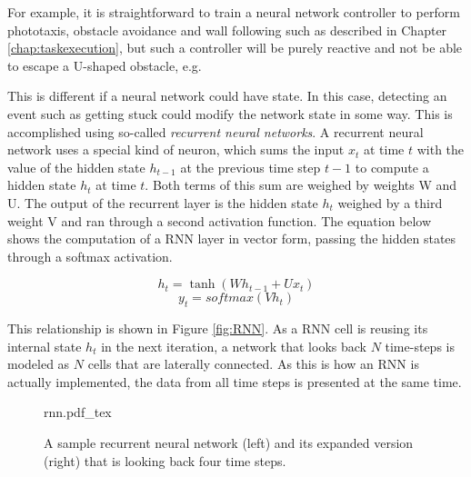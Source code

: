 For example, it is straightforward to train a neural network controller to perform phototaxis, obstacle avoidance and wall following such as described in Chapter \ref{chap:taskexecution}, but such a controller will be purely reactive and not be able to escape a U-shaped obstacle, e.g.

This is different if a neural network could have state. In this case, detecting an event such as getting stuck could modify the network state in some way. This is accomplished using so-called \emph{recurrent neural networks}. A recurrent neural network uses a special kind of neuron, which sums the input $x_t$ at time $t$ with the value of the hidden state $h_{t-1}$ at the previous time step $t-1$ to compute a hidden state $h_t$ at time $t$. Both terms of this sum are weighed by weights W and U. The output of the recurrent layer is the hidden state $h_t$ weighed by a third weight V and ran through a second activation function. The equation below shows the computation of a RNN layer in vector form, passing the hidden states through a softmax activation.

\begin{equation}
h_t = \tanh(Wh_{t-1}+Ux_t)
\end{equation}
\begin{equation}
y_t = softmax(Vh_t)
\end{equation}

This relationship is shown in Figure \ref{fig:RNN}. As a RNN cell is reusing its internal state $h_t$ in the next iteration, a network that looks back $N$ time-steps is modeled as $N$ cells that are laterally connected. As this is how an RNN is actually implemented, the data from all time steps is presented at the same time.  

\begin{figure}[htb]
\tiny
    \centering
    \def\svgwidth{\textwidth}
    {rnn.pdf_tex}
    \caption{A sample recurrent neural network (left) and its expanded version (right) that is looking back four time steps. \label{fig:rnn}}
\end{figure}

